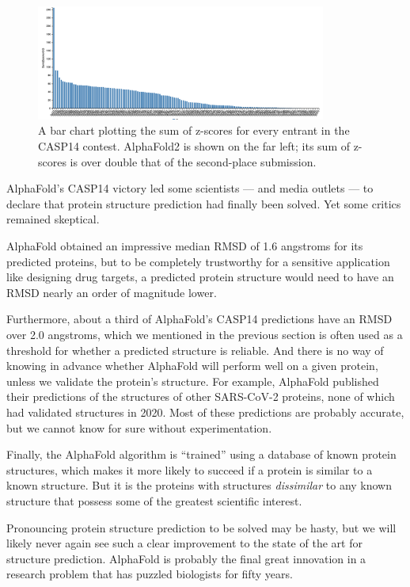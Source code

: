\begin{figure}[h]
	\centering
	\mySfFamily
	\includegraphics[width = 0.85\textwidth]{../images/CASP14_overall_results.png}
	\caption{A bar chart plotting the sum of z-scores for every entrant in the CASP14 contest. AlphaFold2 is shown on the far left; its sum of z-scores is over double that of the second-place submission.}
	\label{fig:CASP14_overall_results}
\end{figure}

AlphaFold's CASP14 victory led some scientists --- and media outlets --- to declare that protein structure prediction had finally been solved. Yet some critics remained skeptical.

AlphaFold obtained an impressive median RMSD of 1.6 angstroms for its predicted proteins, but to be completely trustworthy for a sensitive application like designing drug targets, a predicted protein structure would need to have an RMSD nearly an order of magnitude lower.

Furthermore, about a third of AlphaFold's CASP14 predictions have an RMSD over 2.0 angstroms, which we mentioned in the previous section is often used as a threshold for whether a predicted structure is reliable. And there is no way of knowing in advance whether AlphaFold will perform well on a given protein, unless we validate the protein's structure. For example, AlphaFold published their predictions of the structures of other SARS-CoV-2 proteins, none of which had validated structures in 2020. Most of these predictions are probably accurate, but we cannot know for sure without experimentation.

Finally, the AlphaFold algorithm is ``trained'' using a database of known protein structures, which makes it more likely to succeed if a protein is similar to a known structure. But it is the proteins with structures \textit{dissimilar} to any known structure that possess some of the greatest scientific interest.

Pronouncing protein structure prediction to be solved may be hasty, but we will likely never again see such a clear improvement to the state of the art for structure prediction. AlphaFold is probably the final great innovation in a research problem that has puzzled biologists for fifty years.

